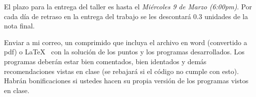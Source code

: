 \documentclass[letterpaper,12pt]{exam}
\begin{document}
\begin{center}
\end{center}

\vspace{1cm}
\noindent El plazo para la entrega del taller es hasta el \emph{Miércoles 9 de Marzo (6:00pm)}. Por cada día de retraso en la entrega del trabajo se les descontará 0.3 unidades de la nota final.

Enviar a mi correo, un comprimido que incluya el archivo en word (convertido a pdf) o \LaTeX~ con la solución de los puntos y los programas desarrollados. Los programas deberán estar bien comentados, bien identados y demás recomendaciones vistas en clase (se rebajará si el código no cumple con esto). Habrán bonificaciones si ustedes hacen su propia versión de los programas vistos en clase. 
\end{document}
